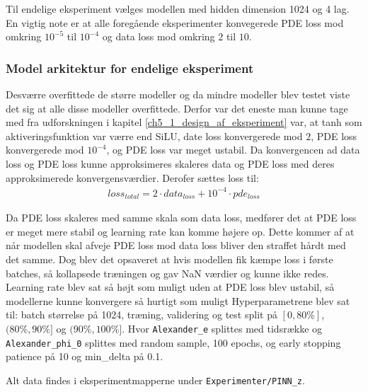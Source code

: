 Til endelige eksperiment vælges modellen med hidden dimension 1024 og 4 lag. En vigtig note er at 
alle foregående eksperimenter konvegerede PDE loss mod omkring $10^{-5}$ til $10^{-4}$ og data loss mod omkring $2$ til $10$. 


\subsubsection{Model arkitektur for endelige eksperiment}
Desværre overfittede de større modeller og da mindre modeller blev testet viste det sig at alle disse modeller overfittede. Derfor var 
det eneste man kunne tage med fra udforskningen i kapitel \ref{ch5_1_design_af_eksperiment} var, at tanh som aktiveringsfunktion var værre end SiLU, date loss konvergerede mod $2$,
PDE loss konvergerede mod $10^{-4}$, og PDE loss var meget ustabil.
Da konvergencen ad data loss og PDE loss kunne approksimeres skaleres data og PDE loss med deres approksimerede konvergensværdier. Derofer sættes loss til:
\begin{align}
    loss_{total} = 2 \cdot data_{loss} + 10^{-4} \cdot pde_{loss}
\end{align}

Da PDE loss skaleres med samme skala som data loss, medfører det at PDE loss er meget mere stabil og learning rate kan komme højere op.
Dette kommer af at når modellen skal afveje PDE loss mod data loss bliver den straffet hårdt med det samme. 
Dog blev det opsaveret at hvis modellen fik kæmpe loss i første batches, så kollapsede træningen og gav NaN værdier og kunne ikke redes.
Learning rate blev sat så højt som muligt uden at PDE loss blev ustabil, så modellerne kunne konvergere så hurtigt som muligt
Hyperparametrene blev sat til: batch størrelse på 1024, træning, validering og test split på $[0, 80\%]$, $(80\%, 90\%]$ og $(90\%, 100\%]$.
Hvor \texttt{Alexander\_e} splittes med tidsrække og \texttt{Alexander\_phi\_0} splittes med random sample, 100 epochs, og early stopping patience på 10 og min\_delta på 0.1.

Alt data findes i eksperimentmapperne under \texttt{Experimenter/PINN\_z}. 

